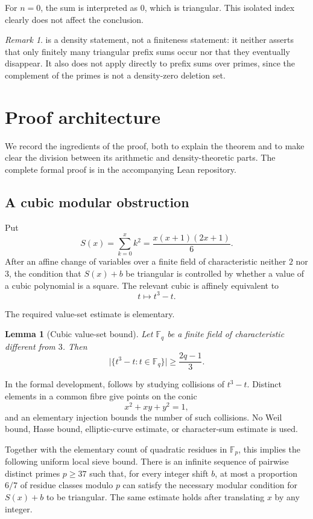 \documentclass[11pt]{article}
\newtheorem{lemma}[theorem]{Lemma}
\theoremstyle{definition}
\theoremstyle{remark}
\newtheorem{remark}[theorem]{Remark}
\newcommand{\FF}{\mathbb{F}}
\newcommand{\card}[1]{\lvert #1\rvert}
\begin{document}
For $n=0$, the sum is interpreted as $0$, which is triangular.  This isolated
index clearly does not affect the conclusion.

\begin{remark}
 is a density statement, not a finiteness statement: it neither
asserts that only finitely many triangular prefix sums occur nor that they
eventually disappear.  It also does not apply directly to prefix sums over
primes, since the complement of the primes is not a density-zero deletion
set.
\end{remark}

\section{Proof architecture}

We record the ingredients of the proof, both to explain the theorem and to
make clear the division between its arithmetic and density-theoretic parts.
The complete formal proof is in the accompanying Lean repository.

\subsection{A cubic modular obstruction}

Put
\[
  S(x)=\sum_{k=0}^{x}k^2
      =\frac{x(x+1)(2x+1)}{6}.
\]
After an affine change of variables over a finite field of characteristic
neither $2$ nor $3$, the condition that $S(x)+b$ be triangular is controlled
by whether a value of a cubic polynomial is a square.  The relevant cubic is
affinely equivalent to
\[
  t\longmapsto t^3-t.
\]

The required value-set estimate is elementary.

\begin{lemma}[Cubic value-set bound]\label{lem:cubic}
Let $\FF_q$ be a finite field of characteristic different from $3$.  Then
\[
  \card{\{t^3-t:t\in\FF_q\}}\geq \frac{2q-1}{3}.
\]
\end{lemma}

In the formal development,  follows by studying collisions
of $t^3-t$.  Distinct elements in a common fibre give points on the conic
\[
  x^2+xy+y^2=1,
\]
and an elementary injection bounds the number of such collisions.  No Weil
bound, Hasse bound, elliptic-curve estimate, or character-sum estimate is
used.

Together with the elementary count of quadratic residues in $\FF_p$, this
implies the following uniform local sieve bound.  There is an infinite sequence
of pairwise distinct primes $p\geq37$ such that, for every integer shift $b$,
at most a proportion $6/7$ of residue classes modulo $p$ can satisfy the
necessary modular condition for $S(x)+b$ to be triangular.  The same estimate
holds after translating $x$ by any integer.
\end{document}
